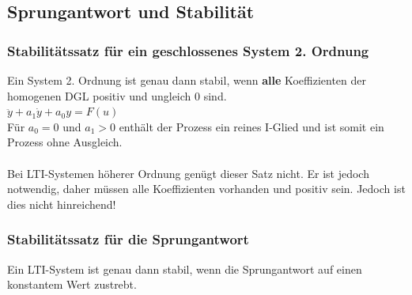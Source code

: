 			
	\subsection{Sprungantwort und Stabilität }
		\subsubsection{Stabilitätssatz für ein geschlossenes System 2. Ordnung }
			Ein System 2. Ordnung ist genau dann stabil, wenn {\bf alle} Koeffizienten der
			homogenen DGL positiv und ungleich 0 sind.\\
			$\ddot{y}+a_1\dot{y}+a_0y=F(u)$ \\
			Für $a_0 = 0$ und $a_1 > 0$ enthält der Prozess ein reines I-Glied und
			ist somit ein Prozess ohne Ausgleich.  \\ \\
			Bei LTI-Systemen höherer Ordnung genügt dieser Satz nicht. Er ist jedoch notwendig, daher müssen alle Koeffizienten vorhanden und positiv sein. Jedoch ist dies nicht hinreichend!
			
		\subsubsection{Stabilitätssatz für die Sprungantwort}
			Ein LTI-System ist genau dann stabil, wenn die Sprungantwort auf einen
			konstantem Wert zustrebt.

